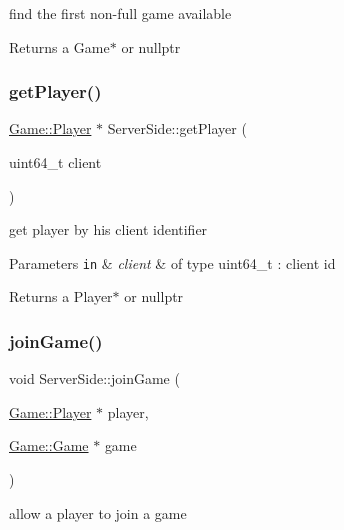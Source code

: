 find the first non-\/full game available 

\begin{DoxyReturn}{Returns}
a Game$\ast$ or nullptr 
\end{DoxyReturn}
\mbox{\label{class_server_side_a2efe0b51ba110d415b3aa5bad8000bbb}} 
\subsubsection{\texorpdfstring{get\+Player()}{getPlayer()}}
{\footnotesize\ttfamily \hyperlink{class_game_1_1_player}{Game\+::\+Player} $\ast$ Server\+Side\+::get\+Player (\begin{DoxyParamCaption}\item[{uint64\+\_\+t}]{client }\end{DoxyParamCaption})}



get player by his client identifier 


\begin{DoxyParams}[1]{Parameters}
\mbox{\tt in}  & {\em client} & of type uint64\+\_\+t \+: client id\\
\hline
\end{DoxyParams}
\begin{DoxyReturn}{Returns}
a Player$\ast$ or nullptr 
\end{DoxyReturn}
\mbox{\label{class_server_side_a4a6174bdaef5367b91277539fe60bca0}} 
\subsubsection{\texorpdfstring{join\+Game()}{joinGame()}}
{\footnotesize\ttfamily void Server\+Side\+::join\+Game (\begin{DoxyParamCaption}\item[{\hyperlink{class_game_1_1_player}{Game\+::\+Player} $\ast$}]{player,  }\item[{\hyperlink{class_game_1_1_game}{Game\+::\+Game} $\ast$}]{game }\end{DoxyParamCaption})}



allow a player to join a game 


